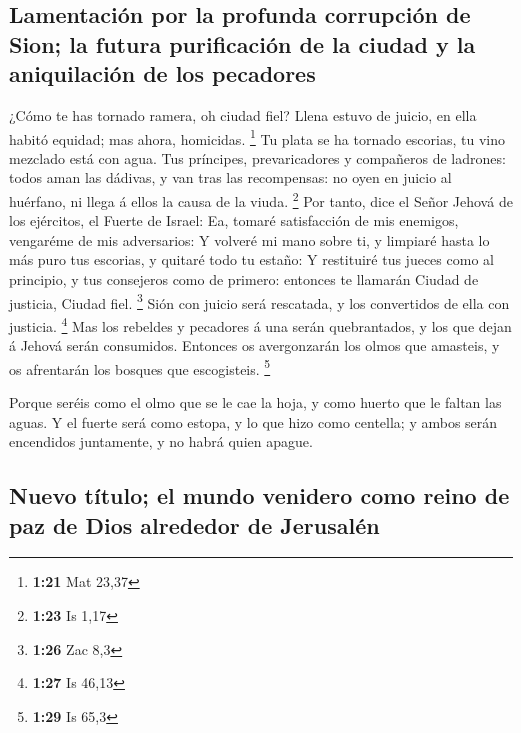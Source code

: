 \hypertarget{lamentaciuxf3n-por-la-profunda-corrupciuxf3n-de-sion-la-futura-purificaciuxf3n-de-la-ciudad-y-la-aniquilaciuxf3n-de-los-pecadores}{%
\subsection{Lamentación por la profunda corrupción de Sion; la futura
purificación de la ciudad y la aniquilación de los
pecadores}\label{lamentaciuxf3n-por-la-profunda-corrupciuxf3n-de-sion-la-futura-purificaciuxf3n-de-la-ciudad-y-la-aniquilaciuxf3n-de-los-pecadores}}

 ¿Cómo te has tornado ramera, oh ciudad fiel? Llena estuvo
de juicio, en ella habitó equidad; mas ahora, homicidas. \footnote{\textbf{1:21}
  Mat 23,37}  Tu plata se ha tornado escorias, tu vino
mezclado está con agua.  Tus príncipes, prevaricadores y
compañeros de ladrones: todos aman las dádivas, y van tras las
recompensas: no oyen en juicio al huérfano, ni llega á ellos la causa de
la viuda. \footnote{\textbf{1:23} Is 1,17}  Por tanto, dice
el Señor Jehová de los ejércitos, el Fuerte de Israel: Ea, tomaré
satisfacción de mis enemigos, vengaréme de mis adversarios:
 Y volveré mi mano sobre ti, y limpiaré hasta lo más puro
tus escorias, y quitaré todo tu estaño:  Y restituiré tus
jueces como al principio, y tus consejeros como de primero: entonces te
llamarán Ciudad de justicia, Ciudad fiel. \footnote{\textbf{1:26} Zac
  8,3}  Sión con juicio será rescatada, y los convertidos
de ella con justicia. \footnote{\textbf{1:27} Is 46,13} 
Mas los rebeldes y pecadores á una serán quebrantados, y los que dejan á
Jehová serán consumidos.  Entonces os avergonzarán los
olmos que amasteis, y os afrentarán los bosques que escogisteis.
\footnote{\textbf{1:29} Is 65,3}

 Porque seréis como el olmo que se le cae la hoja, y como
huerto que le faltan las aguas.  Y el fuerte será como
estopa, y lo que hizo como centella; y ambos serán encendidos
juntamente, y no habrá quien apague.

\hypertarget{nuevo-tuxedtulo-el-mundo-venidero-como-reino-de-paz-de-dios-alrededor-de-jerusaluxe9n}{%
\subsection{Nuevo título; el mundo venidero como reino de paz de Dios
alrededor de
Jerusalén}\label{nuevo-tuxedtulo-el-mundo-venidero-como-reino-de-paz-de-dios-alrededor-de-jerusaluxe9n}}

